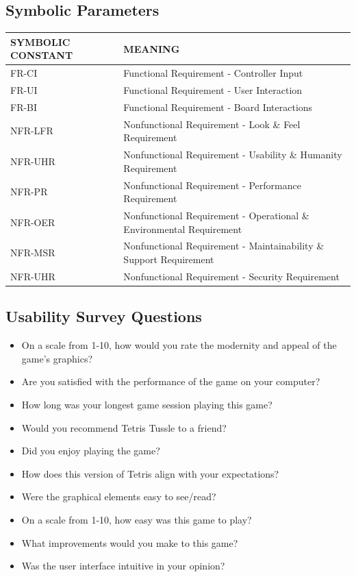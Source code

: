 \documentclass[12pt, titlepage]{article}
\begin{document}
	\subsection{Symbolic Parameters}
	\begin{center}
		\begin{tabular}{|p{}|p{}|}\hline
			\textbf{SYMBOLIC CONSTANT} & \textbf{MEANING }\\\hline
			FR-CI & Functional Requirement - Controller Input  \\\hline
			FR-UI & Functional Requirement - User Interaction  \\\hline
			FR-BI & Functional Requirement - Board Interactions  \\\hline
			NFR-LFR & Nonfunctional Requirement - Look \& Feel Requirement  \\\hline
			NFR-UHR & Nonfunctional Requirement - Usability \& Humanity Requirement  \\\hline
			NFR-PR & Nonfunctional Requirement - Performance Requirement  \\\hline
			NFR-OER & Nonfunctional Requirement - Operational \& Environmental Requirement  \\\hline
			NFR-MSR & Nonfunctional Requirement - Maintainability \& Support Requirement  \\\hline
			NFR-UHR & Nonfunctional Requirement - Security Requirement  \\\hline
		\end{tabular}
	\end{center}
	\subsection{Usability Survey Questions}
	\begin{itemize}
		\item On a scale from 1-10, how would you rate the modernity and appeal of the game's graphics? 
		\item Are you satisfied with the performance of the game on your computer?
		\item How long was your longest game session playing this game?
		\item Would you recommend Tetris Tussle to a friend?
		\item Did you enjoy playing the game?
		\item How does this version of Tetris align with your expectations?
		\item Were the graphical elements easy to see/read?
		\item On a scale from 1-10, how easy was this game to play?
		\item What improvements would you make to this game?
		\item Was the user interface intuitive in your opinion?
	\end{itemize}
	
\end{document}
